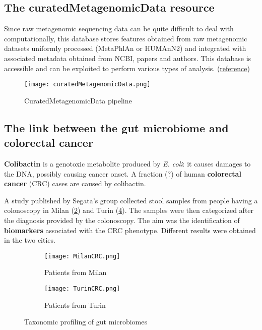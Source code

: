 \vspace{3cm}

\subsection{The curatedMetagenomicData resource}

Since raw metagenomic sequencing data can be quite difficult to deal with computationally, this database stores features obtained from raw metagenomic datasets uniformly processed (MetaPhlAn or HUMAnN2) and integrated with associated metadata obtained from NCBI, papers and authors. This database is accessible and can be exploited to perform various types of analysis. (\href{https://bioconductor.org/packages/release/data/experiment/html/curatedMetagenomicData.html}{reference})

\begin{figure}[!h]
\centering
\texttt{[image: curatedMetagenomicData.png]}
\caption{\label{fig:curatedMetagenomicData}CuratedMetagenomicData pipeline}
\end{figure}

\subsection{The link between the gut microbiome and colorectal cancer}

\textbf{Colibactin} is a genotoxic metabolite produced by \emph{E. coli}: it causes damages to the DNA, possibly causing cancer onset. A fraction (?) of human \textbf{colorectal cancer} (CRC) cases are caused by colibactin. 

A study published by Segata’s group collected stool samples from people having a colonoscopy in Milan (\ref{fig:milanCRC}) and Turin (\ref{fig:turinCRC}). The samples were then categorized after the diagnosis provided by the colonoscopy. The aim was the identification of \textbf{biomarkers} associated with the CRC phenotype. Different results were obtained in the two cities. \\

\begin{figure}[!h]
\centering
\begin{subfigure}{.45\textwidth}
    \centering
    \texttt{[image: MilanCRC.png]}
    \caption{\label{fig:milanCRC}Patients from Milan}
\end{subfigure}
%
\begin{subfigure}{.45\textwidth}
    \centering
    \texttt{[image: TurinCRC.png]}
    \caption{\label{fig:turinCRC}Patients from Turin}
\end{subfigure}
\caption{Taxonomic profiling of gut microbiomes}
\end{figure}

